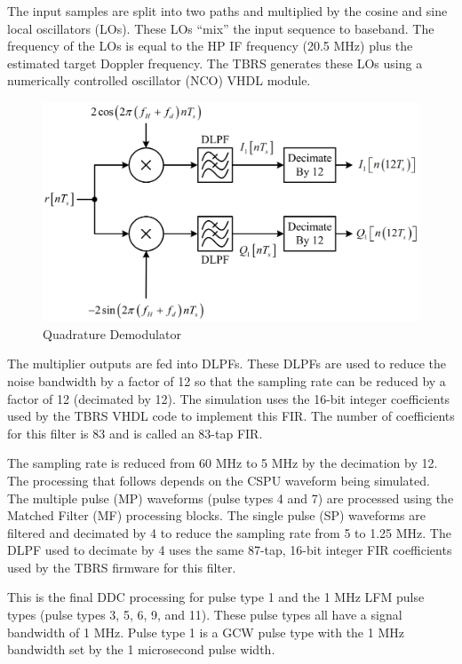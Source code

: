 \documentclass[12pt,english]{article}
\begin{document}
The input samples are split into two paths and multiplied by the
cosine and sine local oscillators (LOs). These LOs ``mix'' the input
sequence to baseband. The frequency of the LOs is equal to the HP IF
frequency (20.5 MHz) plus the estimated target Doppler frequency. The
TBRS generates these LOs using a numerically controlled oscillator
(NCO) VHDL module.
\begin{figure}[ht]
  \noindent \begin{centering}
  \includegraphics{QuadratureDemodulator.png}\medskip{}
  \caption{Quadrature Demodulator}
  \label{fig:QuadratureDemodulator}
  \par \end{centering}
\end{figure}

The multiplier outputs are fed into DLPFs. These DLPFs are used to
reduce the noise bandwidth by a factor of 12 so that the sampling rate
can be reduced by a factor of 12 (decimated by 12). The simulation
uses the 16-bit integer coefficients used by the TBRS VHDL code to
implement this FIR. The number of coefficients for this filter is 83
and is called an 83-tap FIR.

The sampling rate is reduced from 60 MHz to 5 MHz by the decimation by
12. The processing that follows depends on the CSPU waveform being
simulated. The multiple pulse (MP) waveforms (pulse types 4 and 7) are
processed using the Matched Filter (MF) processing blocks. The single
pulse (SP) waveforms are filtered and decimated by 4 to reduce the
sampling rate from 5 to 1.25 MHz. The DLPF used to decimate by 4 uses
the same 87-tap, 16-bit integer FIR coefficients used by the TBRS
firmware for this filter.

This is the final DDC processing for pulse type 1 and the 1 MHz LFM
pulse types (pulse types 3, 5, 6, 9, and 11). These pulse types all
have a signal bandwidth of 1 MHz. Pulse type 1 is a GCW pulse type
with the 1 MHz bandwidth set by the 1 microsecond pulse width.
\end{document}
